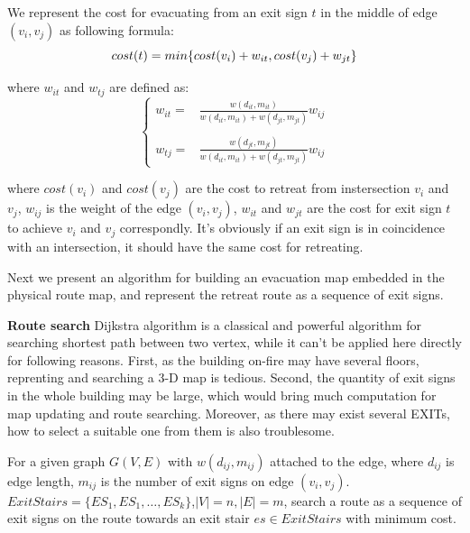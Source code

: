 \documentclass[conference]{IEEEtran}
\begin{document}
    We represent the cost for evacuating from an exit sign $t$ in the middle of edge $(v_i,v_j)$ as following formula:
    \begin{equation}
    \label{eqn:weight}
    cost(t)=min\{cost(v_i) + w_{it}, cost(v_j) + w_{jt}\}\\
    \end{equation}

    where $w_{it}$ and $w_{tj}$ are defined as:
    \begin{equation}
    \left\{
    \begin{array}{rcl}
    w_{it} =&\frac{w(d_{it},m_{it})}{w(d_{it},m_{it}) + w(d_{jt},m_{jt})} w_{ij}\\ \\
    w_{tj} =& \frac{w(d_{jt},m_{jt})} {w(d_{it},m_{it}) + w(d_{jt},m_{jt})}w_{ij}
    \end{array}
    \right.
    \end{equation}

    where $cost(v_i)$ and $cost(v_j)$ are the cost to retreat from instersection $v_i$ and $v_j$, $w_{ij}$ is the weight of the edge $(v_i,v_j)$, $w_{it}$ and $w_{jt}$ are the cost for exit sign $t$ to achieve $v_i$ and $v_j$ correspondly. It's obviously if an exit sign is in coincidence with an intersection, it should have the same cost for retreating.

    Next we present an algorithm for building an evacuation map embedded in the physical route map, and represent the retreat route as a sequence of exit signs.

   {\bf Route search} 
    Dijkstra algorithm is a classical and powerful algorithm for searching shortest path between two vertex, while it can't be applied here directly for following reasons. First, as the building on-fire may have several floors, reprenting and searching a 3-D map is tedious. Second, the quantity of exit signs in the whole building may be large, which would bring much computation for map updating and route searching. Moreover, as there may exist several EXITs, how to select a suitable one from them is also troublesome. 
    \begin{definition}      
      For a given graph $G(V,E)$ with $w(d_{ij},m_{ij})$ attached to the edge, where $d_{ij}$ is edge length, $m_{ij}$ is the number of exit signs on edge $(v_i,v_j)$. $ExitStairs=\{ES_1,ES_1,\dots,ES_k\}$,$\vert V \vert = n, \vert E \vert = m$, search a route as a sequence of exit signs on the route towards an exit stair $es \in ExitStairs$ with minimum cost.
    \end{definition}
\end{document}
